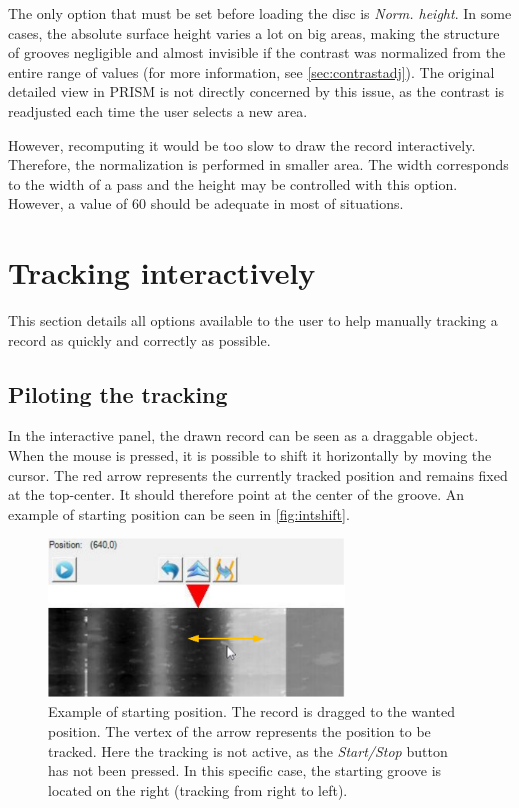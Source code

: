 The only option that must be set before loading the disc is \emph{Norm. height}. In some cases, the absolute surface height varies a lot on big areas, making the structure of grooves negligible and almost invisible if the contrast was normalized from the entire range of values (for more information, see \autoref{sec:contrastadj}). The original detailed view in PRISM is not directly concerned by this issue, as the contrast is readjusted each time the user selects a new area.

However, recomputing it would be too slow to draw the record interactively. Therefore, the normalization is performed in smaller area. The width corresponds to the width of a pass and the height may be controlled with this option. However, a value of 60 should be adequate in most of situations.

\section{Tracking interactively}

This section details all options available to the user to help manually tracking a record as quickly and correctly as possible.

\subsection{Piloting the tracking}

In the interactive panel, the drawn record can be seen as a draggable object. When the mouse is pressed, it is possible to shift it horizontally by moving the cursor. The red arrow represents the currently tracked position and remains fixed at the top-center. It should therefore point at the center of the groove. An example of starting position can be seen in \autoref{fig:intshift}.

\begin{figure}[!ht]
\centering
\includegraphics[width=0.7\textwidth]{images/int-mouse-shift}
\caption[Example of starting position.]
{Example of starting position. The record is dragged to the wanted position. The vertex of the arrow represents the position to be tracked. Here the tracking is not active, as the \emph{Start/Stop} button has not been pressed. In this specific case, the starting groove is located on the right (tracking from right to left).}
\label{fig:intshift}
\end{figure}


